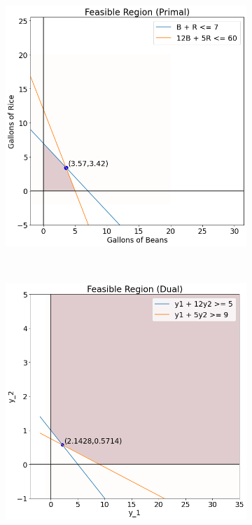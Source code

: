 \documentclass[11pt]{article}
\begin{document}
\begin{enumerate}
\begin{enumerate}
        \begin{figure}[h]
            \centering 
            \begin{subfigure}{0.5\textwidth}
                \centering
                \includegraphics[scale=.33]{feasible_out.png}
            \end{subfigure}%
            ~
            \begin{subfigure}{0.5\textwidth}
                \centering
                \includegraphics[scale=.33]{dual_out_2.png}
            \end{subfigure}
        \end{figure}


\end{enumerate}
\end{enumerate}
\end{document}
